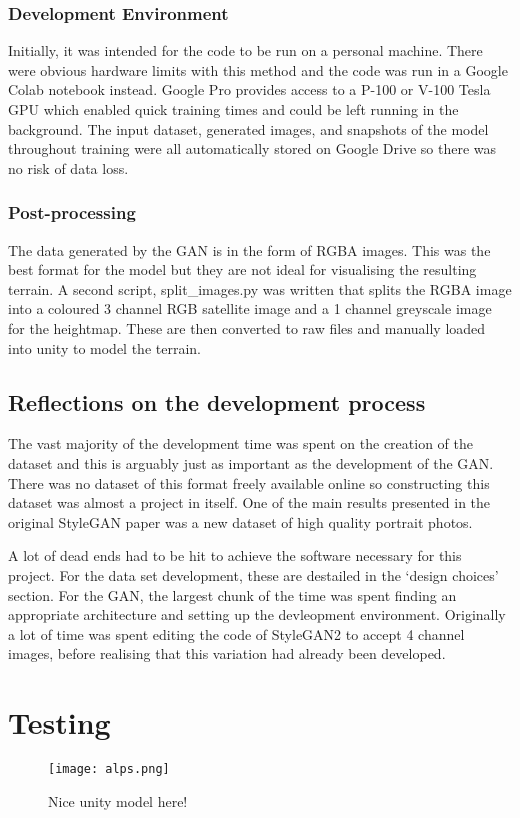 \documentclass[a4paper]{report}
\begin{document}
\subsubsection{Development Environment}
Initially, it was intended for the code to be run on a personal machine. There were obvious hardware limits with this method and the code was run in a Google Colab notebook instead. Google Pro provides access to a P-100 or V-100 Tesla GPU which enabled quick training times and could be left running in the background. The input dataset, generated images, and snapshots of the model throughout training were all automatically stored on Google Drive so there was no risk of data loss.

\subsubsection{Post-processing}
The data generated by the GAN is in the form of RGBA images. This was the best format for the model but they are not ideal for visualising the resulting terrain. A second script, split\_images.py was written that splits the RGBA image into a coloured 3 channel RGB satellite image and a 1 channel greyscale image for the heightmap. These are then converted to raw files and manually loaded into unity to model the terrain.
\subsection{Reflections on the development process}
The vast majority of the development time was spent on the creation of the dataset and this is arguably just as important as the development of the GAN. There was no dataset of this format freely available online so constructing this dataset was almost a project in itself. One of the main results presented in the original StyleGAN paper \cite{ToDo} was a new dataset of high quality portrait photos.

A lot of dead ends had to be hit to achieve the software necessary for this project. For the data set development, these are destailed in the `design choices' section. For the GAN, the largest chunk of the time was spent finding an appropriate architecture and setting up the devleopment environment. Originally a lot of time was spent editing the code of StyleGAN2 to accept 4 channel images, before realising that this variation had already been developed.
\section{Testing}
\begin{figure}[H]
    \centering
        \texttt{[image: alps.png]}
        \caption{Nice unity model here!}
        \label{fig:ToDo}
\end{figure}
\end{document}
